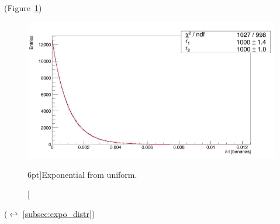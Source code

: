 (Figure~\ref{fig:expo_from_uniform})

\begin{figure}
	\includegraphics{exercise/expo_from_uniform.png}
	\caption[Exponential from uniform.][6pt]{Exponential from uniform.}
	\label{fig:expo_from_uniform}
\end{figure}

($\hookleftarrow$ \ref{subsec:expo_distr})
